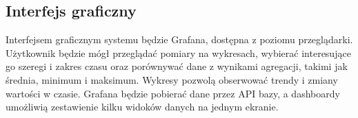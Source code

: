 \documentclass[11pt,a4paper]{article}
\begin{document}
\subsection{Interfejs graficzny}
\label{sec:ui}
Interfejsem graficznym systemu będzie Grafana, dostępna z poziomu
przeglądarki. Użytkownik będzie mógł przeglądać pomiary na wykresach,
wybierać interesujące go szeregi i zakres czasu oraz porównywać dane
z wynikami agregacji, takimi jak średnia, minimum i maksimum.
Wykresy pozwolą obserwować trendy i zmiany wartości w czasie.
Grafana będzie pobierać dane przez API bazy, a dashboardy umożliwią
zestawienie kilku widoków danych na jednym ekranie.


\end{document}

